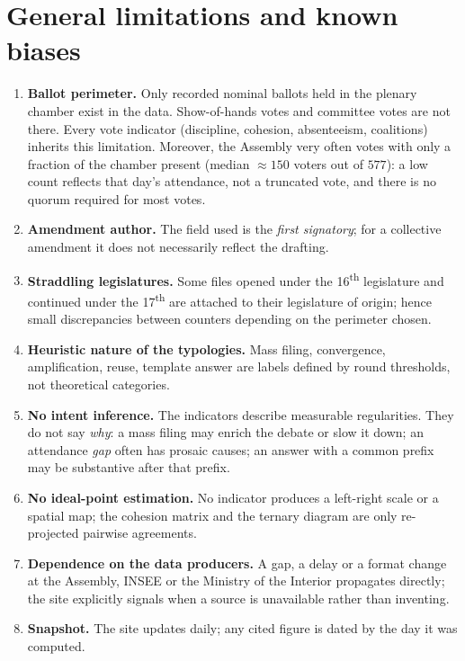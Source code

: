 \section{General limitations and known biases}\label{sec:limites-en}
\begin{enumerate}[label=L\arabic*.]
  \item \textbf{Ballot perimeter.} Only recorded nominal ballots held in the
        plenary chamber exist in the data. Show-of-hands votes and committee votes
        are not there. Every vote indicator (discipline, cohesion, absenteeism,
        coalitions) inherits this limitation. Moreover, the Assembly very often
        votes with only a fraction of the chamber present (median $\approx 150$
        voters out of $577$): a low count reflects that day's attendance, not a
        truncated vote, and there is no quorum required for most votes.
  \item \textbf{Amendment \og{}author\fg{}.} The field used is the \emph{first
        signatory}; for a collective amendment it does not necessarily reflect the
        drafting.
  \item \textbf{Straddling legislatures.} Some files opened under the
        16\textsuperscript{th} legislature and continued under the
        17\textsuperscript{th} are attached to their legislature of origin; hence
        small discrepancies between counters depending on the perimeter chosen.
  \item \textbf{Heuristic nature of the typologies.} \og{}Mass filing\fg{},
        \og{}convergence\fg{}, \og{}amplification\fg{}, \og{}reuse\fg{},
        \og{}template answer\fg{} are labels defined by round thresholds, not
        theoretical categories.
  \item \textbf{No intent inference.} The indicators describe measurable
        regularities. They do not say \emph{why}: a mass filing may enrich the
        debate or slow it down; an attendance \emph{gap} often has prosaic causes;
        an answer with a common prefix may be substantive after that prefix.
  \item \textbf{No ideal-point estimation.} No indicator produces a left-right scale
        or a spatial map; the cohesion matrix and the ternary diagram are only
        re-projected pairwise agreements.
  \item \textbf{Dependence on the data producers.} A gap, a delay or a format change
        at the Assembly, INSEE or the Ministry of the Interior propagates directly;
        the site explicitly signals when a source is unavailable rather than
        inventing.
  \item \textbf{Snapshot.} The site updates daily; any cited figure is dated by the
        day it was computed.
\end{enumerate}

